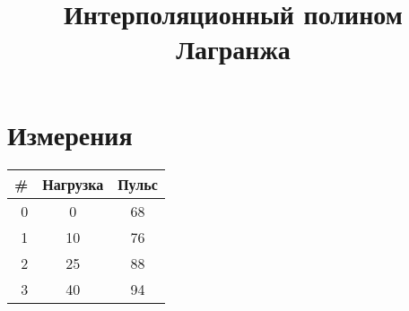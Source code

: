 \documentclass[oneside,final,14pt]{extreport}
\begin{document}
\title{Интерполяционный полином Лагранжа}

\maketitle

\chapter*{Измерения}
\begin{table}[ht]
	\centering
	\begin{tabular}{|r | c | c|}
		\hline \textbf{\#} &  \textbf{Нагрузка} & \textbf{Пульс} \\ \hline
		0 & 0	&	68	\\ \hline
		1 & 10	&	76	\\ \hline
		2 & 25	&	88	\\ \hline
		3 & 40	&	94	\\ \hline
	\end{tabular}
	\label{measurements}
\end{table}
\end{document}
